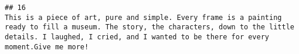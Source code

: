 \documentclass[
]{article}
\begin{document}
\begin{verbatim}
## 16                                                                                                                                                                                                                                                                                                                                                                                                                                                                                                                                                                                                                                                                                                                                                                                                                                                                                                                                                                                                                                                                                                                                                                                                                                                                                                                                                                                                                                                                                                                                                                                                                                                                                                                                                                                                                                                                                                                                                                                                                                                                                                                                                                                                                                                                                                                                                                                                                                                                                                                                                                                                                                                                                                                                                                                                                                    This is a piece of art, pure and simple. Every frame is a painting ready to fill a museum. The story, the characters, down to the little details. I laughed, I cried, and I wanted to be there for every moment.Give me more!

\end{verbatim}
\end{document}
